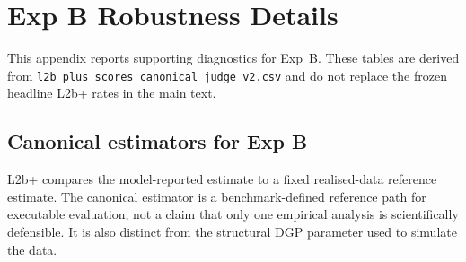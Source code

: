 \documentclass{article}
\begin{document}
\section{Exp B Robustness Details}
\label{app:expb-robustness}

This appendix reports supporting diagnostics for Exp~B. These tables are
derived from \texttt{l2b\_plus\_scores\_canonical\_judge\_v2.csv} and do not
replace the frozen headline L2b+ rates in the main text.

\subsection{Canonical estimators for Exp B}
\label{app:canonical_estimators}

L2b+ compares the model-reported estimate to a fixed realised-data reference
estimate. The canonical estimator is a benchmark-defined reference path for
executable evaluation, not a claim that only one empirical analysis is
scientifically defensible. It is also distinct from the structural DGP
parameter used to simulate the data.
\end{document}

